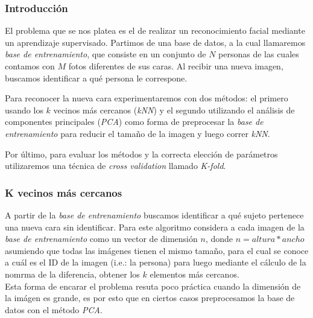 \subsubsection*{Introducción}
\par El problema que se nos platea es el de realizar un reconocimiento facial mediante un aprendizaje supervisado. Partimos de una base de datos, a la cual llamaremos \textit{base de entrenamiento},
que consiste en un conjunto de $N$ personas de las cuales contamos con $M$ fotos diferentes de sus caras. Al recibir una nueva imagen, buscamos identificar
a qu\'e persona le correspone. 
\par Para reconocer la nueva cara experimentaremos con dos m\'etodos: el primero usando los $k$ vecinos m\'as cercanos (\textit{kNN}) y 
el segundo utilizando el an\'alisis de componentes principales (\textit{PCA}) como forma de preprocesar la \textit{base de entrenamiento} para reducir el 
tama\~{n}o de la imagen y luego correr \textit{kNN}. 
\par Por \'ultimo, para evaluar los m\'etodos y la correcta elecci\'on de par\'ametros utilizaremos una t\'ecnica de \textit{cross validation} llamado
\textit{K-fold}.

\subsubsection*{K vecinos m\'as cercanos}
\par A partir de la \textit{base de entrenamiento} buscamos identificar a qu\'e sujeto pertenece una nueva cara sin identificar.
Para este algoritmo considera a cada imagen de la \textit{base de entrenamiento} como un vector de dimensi\'on $n$, donde $n = altura*ancho$ asumiendo que
todas las im\'agenes tienen el mismo tama\~no, para el cual se conoce a cu\'al es el ID de la imagen (i.e.: la persona) para luego mediante el c\'alculo
de la nomrma de la diferencia, obtener los $k$ elementos m\'as cercanos.\\
Esta forma de encarar el problema resuta poco pr\'actica cuando la dimensi\'on de la im\'agen es grande, es por esto que en ciertos casos preprocesamos
la base de datos con el m\'etodo \textit{PCA}.

